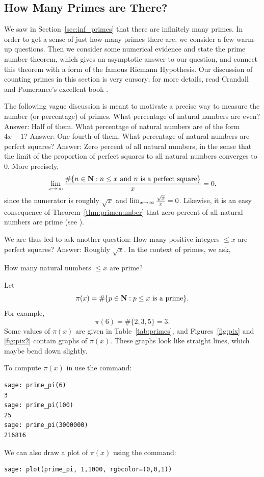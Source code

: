 \subsection{How Many Primes are There?}
We saw in Section~\ref{sec:inf_primes}
that there are infinitely many primes.
In order to get a sense of just how many primes there are,
we consider a few warm-up questions.
Then we consider some numerical evidence and state
the prime number theorem, which gives an asymptotic answer
to our question, and connect this theorem with a form
of the famous Riemann Hypothesis.
Our discussion of counting primes in this section is very cursory;
for more details, read Crandall and Pomerance's excellent
book \cite[\S1.1.5]{primenumbers}.

The following vague discussion is meant to motivate a precise way to
measure the number (or percentage) of primes. What percentage of
natural numbers are even?  Answer: Half of them.  What percentage of
natural numbers are of the form $4x-1$?  Answer: One fourth of them.
What percentage of natural numbers are perfect squares?  Answer: Zero
percent of all natural numbers, in the sense that the limit of the
proportion of perfect squares to all natural numbers converges to~$0$.
More precisely,
$$
  \lim_{x\rightarrow \infty}
   \frac{\# \{n\in\mathbf{N} :
         n \leq x \text{ and $n$ is a perfect square}\}}{x} = 0,
$$
since the numerator is roughly $\sqrt{x}$ and
$\lim_{x\rightarrow\infty}\frac{\sqrt{x}}{x} = 0$.
Likewise, it is an easy consequence of Theorem~\ref{thm:primenumber}
that zero percent of all natural numbers are prime
(see ).

We are thus led to ask another question: How many positive integers
$\leq x$ are perfect squares?  Answer: Roughly $\sqrt{x}$.  In the
context of primes, we ask,
\begin{question}
How many natural numbers $\leq x$ are prime?
\end{question}

Let
$$
   \pi(x) = \#\{p\in \mathbf{N} : p \leq x \text{ is a prime}\}.
$$
For example,
$$
 \pi(6) =\#\{2,3,5\} = 3.
$$
Some values of $\pi(x)$ are given in Table~\ref{tab:primes},
and Figures~\ref{fig:pix} and \ref{fig:pix2} contain graphs of $\pi(x)$.
These graphs look like straight lines, which maybe bend down slightly.
\begin{sg}\label{sg:computepi}
To compute $\pi(x)$ in \sage use the  command:
\begin{verbatim}
sage: prime_pi(6)
3
sage: prime_pi(100)
25
sage: prime_pi(3000000)
216816
\end{verbatim}
We can also draw a plot of $\pi(x)$ using the  command:
\begin{verbatim}
sage: plot(prime_pi, 1,1000, rgbcolor=(0,0,1))
\end{verbatim}

\end{sg}

